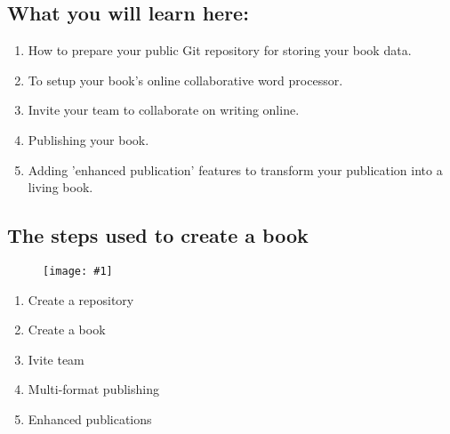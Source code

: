 \documentclass{article}
\newlength{\imgwidth}
\newcommand\scaledgraphics[2]{%
                
\settowidth{\imgwidth}{\texttt{[image: \#1]}}%
                
\setlength{\imgwidth}{\minof{\imgwidth}{#2\textwidth}}%
                
\texttt{[image: \#1]}%
                
}
\begin{document}
\subsection{What you will learn here:}\label{H7757657}


\begin{enumerate}
\item How to prepare your public Git repository for storing your book data.


\item To setup your book's online collaborative word processor.


\item Invite your team to collaborate on writing online.


\item Publishing your book. 


\item Adding 'enhanced publication' features to  transform your publication into a living book.


\end{enumerate}

\subsection{The steps used to create a book}\label{H3159430}


\begin{figure}
\scaledgraphics{fec439eb-c4d6-4587-a4a2-affde7c45586.png}{0.25}
\label{F18710661}
\end{figure}

\begin{enumerate}
\item Create a repository


\item Create a book


\item Ivite team


\item Multi-format publishing


\item Enhanced publications


\end{enumerate}
\end{document}
